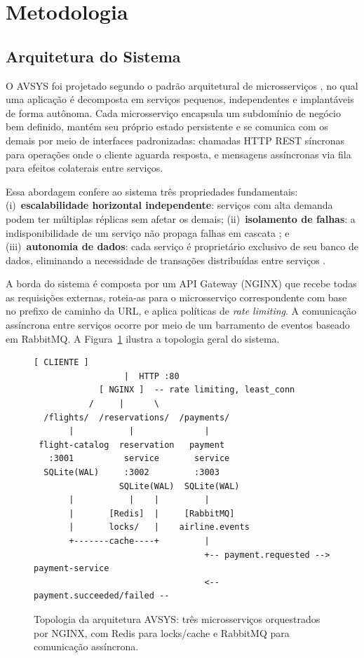 \documentclass[12pt]{article}
\begin{document}
\section{Metodologia}

\subsection{Arquitetura do Sistema}

O AVSYS foi projetado segundo o padrão arquitetural de microsserviços \cite{newman2015},
no qual uma aplicação é decomposta em serviços pequenos, independentes e implantáveis
de forma autônoma. Cada microsserviço encapsula um subdomínio de negócio bem definido,
mantém seu próprio estado persistente e se comunica com os demais por meio de interfaces
padronizadas: chamadas HTTP REST síncronas para operações onde o cliente aguarda
resposta, e mensagens assíncronas via fila para efeitos colaterais entre serviços.

Essa abordagem confere ao sistema três propriedades fundamentais: (i)~\textbf{escalabilidade
horizontal independente}: serviços com alta demanda podem ter múltiplas réplicas sem
afetar os demais; (ii)~\textbf{isolamento de falhas}: a indisponibilidade de um
serviço não propaga falhas em cascata \cite{kleppmann2017}; e
(iii)~\textbf{autonomia de dados}: cada serviço é proprietário exclusivo de seu banco
de dados, eliminando a necessidade de transações distribuídas entre serviços
\cite{richardson2018}.

A borda do sistema é composta por um API Gateway (NGINX) que recebe todas as
requisições externas, roteia-as para o microsserviço correspondente com base no prefixo
de caminho da URL, e aplica políticas de \textit{rate limiting}. A comunicação
assíncrona entre serviços ocorre por meio de um barramento de eventos baseado em
RabbitMQ. A Figura~\ref{fig:arch} ilustra a topologia geral do sistema.

\begin{figure}[ht]
\centering
\begin{lstlisting}[language={}]
             [ CLIENTE ]
                  |  HTTP :80
             [ NGINX ]  -- rate limiting, least_conn
           /     |      \
  /flights/  /reservations/  /payments/
       |           |              |
 flight-catalog  reservation   payment
   :3001          service       service
  SQLite(WAL)     :3002         :3003
                 SQLite(WAL)  SQLite(WAL)
       |           |    |         |
       |       [Redis]  |     [RabbitMQ]
       |       locks/   |    airline.events
       +-------cache----+         |
                                  +-- payment.requested -->  payment-service
                                  <-- payment.succeeded/failed --
\end{lstlisting}
\caption{Topologia da arquitetura AVSYS: três microsserviços orquestrados por NGINX,
  com Redis para locks/cache e RabbitMQ para comunicação assíncrona.}
\label{fig:arch}
\end{figure}
\end{document}
